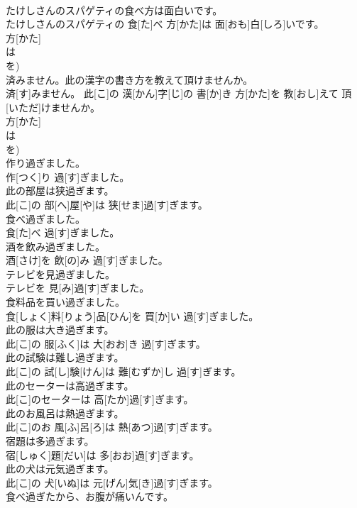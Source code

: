 \documentclass[8pt]{extreport}
\begin{document}
\begin{CJK}{UTF8}{min}
\\	たけしさんのスパゲティの食べ方は面白いです。	
\\	たけしさんのスパゲティの 食[た]べ 方[かた]は 面[おも]白[しろ]いです。 
\\	方[かた] 
\\	は 
\\	を)
\\	済みません。此の漢字の書き方を教えて頂けませんか。	
\\	済[す]みません。 此[こ]の 漢[かん]字[じ]の 書[か]き 方[かた]を 教[おし]えて 頂[いただ]けませんか。 
\\	方[かた] 
\\	は 
\\	を)
\\	作り過ぎました。	
\\	作[つく]り 過[す]ぎました。
\\	此の部屋は狭過ぎます。	
\\	此[こ]の 部[へ]屋[や]は 狭[せま]過[す]ぎます。
\\	食べ過ぎました。	
\\	食[た]べ 過[す]ぎました。
\\	酒を飲み過ぎました。	
\\	酒[さけ]を 飲[の]み 過[す]ぎました。
\\	テレビを見過ぎました。	
\\	テレビを 見[み]過[す]ぎました。
\\	食料品を買い過ぎました。	
\\	食[しょく]料[りょう]品[ひん]を 買[か]い 過[す]ぎました。
\\	此の服は大き過ぎます。	
\\	此[こ]の 服[ふく]は 大[おお]き 過[す]ぎます。
\\	此の試験は難し過ぎます。	
\\	此[こ]の 試[し]験[けん]は 難[むずか]し 過[す]ぎます。
\\	此のセーターは高過ぎます。	
\\	此[こ]のセーターは 高[たか]過[す]ぎます。
\\	此のお風呂は熱過ぎます。	
\\	此[こ]のお 風[ふ]呂[ろ]は 熱[あつ]過[す]ぎます。
\\	宿題は多過ぎます。	
\\	宿[しゅく]題[だい]は 多[おお]過[す]ぎます。
\\	此の犬は元気過ぎます。	
\\	此[こ]の 犬[いぬ]は 元[げん]気[き]過[す]ぎます。
\\	食べ過ぎたから、お腹が痛いんです。	

\end{CJK}
\end{document}
